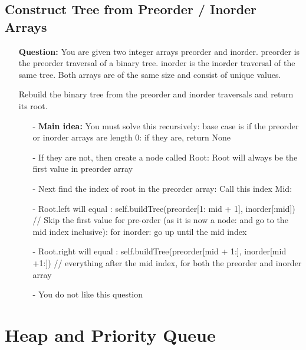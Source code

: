 \documentclass[12pt]{article}
\begin{document}
\subsection{Construct Tree from Preorder / Inorder Arrays}
\begin{enumerate}
  \item[] \textbf{Question:} You are given two integer arrays preorder and inorder. preorder is the preorder traversal of a binary tree. inorder is the inorder traversal of the same tree. Both arrays are of the same size and consist of unique values.

Rebuild the binary tree from the preorder and inorder traversals and return its root.

    \begin{enumerate}
      \item[-] \textbf{Main idea:} You must solve this recursively: base case is if the preorder or inorder arrays are length 0: if they are, return None
      \item[-] If they are not, then create a node called Root: Root will always be the first value in preorder array
      \item[-] Next find the index of root in the preorder array: Call this index Mid:
      \item[-] Root.left will equal : self.buildTree(preorder[1: mid + 1], inorder[:mid]) // Skip the first value for pre-order (as it is now a node: and go to the mid index inclusive): for inorder: go up until the mid index
      \item[-] Root.right will equal : self.buildTree(preorder[mid + 1:], inorder[mid +1:]) // everything after the mid index, for both the preorder and inorder array
      \item[-] You do not like this question


    \end{enumerate}
\end{enumerate}




\section{Heap and Priority Queue}
\end{document}
